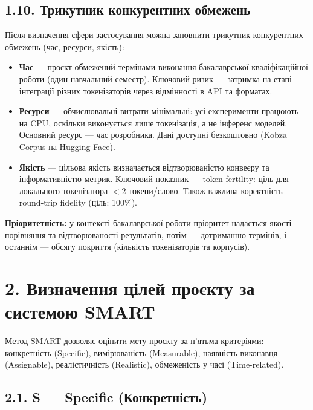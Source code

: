 \documentclass[14pt]{extarticle}
\begin{document}
\subsection*{1.10. Трикутник конкурентних обмежень}

Після визначення сфери застосування можна заповнити трикутник конкурентних обмежень (час, ресурси, якість):

\begin{itemize}
  \item \textbf{Час} --- проєкт обмежений термінами виконання бакалаврської кваліфікаційної роботи (один навчальний семестр). Ключовий ризик --- затримка на етапі інтеграції різних токенізаторів через відмінності в API та форматах.

  \item \textbf{Ресурси} --- обчислювальні витрати мінімальні: усі експерименти працюють на CPU, оскільки виконується лише токенізація, а не інференс моделей. Основний ресурс --- час розробника. Дані доступні безкоштовно (Kobza Corpus на Hugging Face).

  \item \textbf{Якість} --- цільова якість визначається відтворюваністю конвеєру та інформативністю метрик. Ключовий показник --- token fertility: ціль для локального токенізатора $<$2 токени/слово. Також важлива коректність round-trip fidelity (ціль: 100\%).
\end{itemize}

\textbf{Пріоритетність:} у контексті бакалаврської роботи пріоритет надається якості порівняння та відтворюваності результатів, потім --- дотриманню термінів, і останнім --- обсягу покриття (кількість токенізаторів та корпусів).

\section*{2. Визначення цілей проєкту за системою SMART}

Метод SMART дозволяє оцінити мету проєкту за п'ятьма критеріями: конкретність (Specific), вимірюваність (Measurable), наявність виконавця (Assignable), реалістичність (Realistic), обмеженість у часі (Time-related).

\subsection*{2.1. S --- Specific (Конкретність)}
\end{document}
